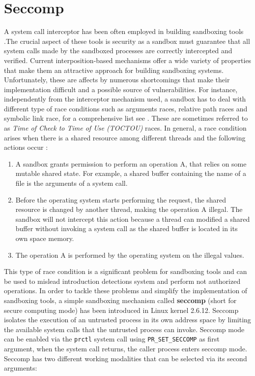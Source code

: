 \section{Seccomp}

A system call interceptor has been often employed in building sandboxing tools \cite{Janus,Garfinkel03ostia:a,MapBox, others}.The crucial aspect of these tools is security as a sandbox must guarantee that all system calls made by the sandboxed processes are correctly intercepted and verified. Current interposition-based mechanisms offer a wide variety of properties that make them an attractive approach for building sandboxing systems. Unfortunately, these are affects by numerous shortcomings that make their implementation difficult and a possible source of vulnerabilities. For instance, independently from the interceptor mechanism used, a sandbox has to deal with different type of race conditions such as arguments races, relative path races and symbolic link race, for a comprehensive list see \cite{garfinkel:traps, Watson_exploitingconcurrency}. These are sometimes referred to as \textit{Time of Check to Time of Use (TOCTOU)} races. In general, a race condition arises when there is a shared resource among different threads and the following actions occur : 
\begin{enumerate}

\item A sandbox grants permission to perform an operation A, that relies on some mutable shared state. For example, a shared buffer containing the name of a file is the arguments of a system call. 

\item Before the operating system starts performing the request, the shared resource is changed by another thread, making the operation A illegal. The sandbox will not intercept this action because a thread can modified a shared buffer without invoking a system call as the shared buffer is located in its own space memory. 

\item The operation A is performed by the operating system on the illegal values. 
\end{enumerate}  

This type of race condition is a significant problem for sandboxing tools and can be used to mislead introduction detections system and perform not authorized operations. In order to tackle these problems and simplify the implementation of sandboxing tools, a simple sandboxing mechanism called \textbf{seccomp} (short for secure computing mode)  has been introduced in Linux kernel 2.6.12. Seccomp isolates the execution of an untrusted process in its own address space by limiting the available system calls that the untrusted process can invoke. Seccomp mode can be enabled via the \lstinline$prctl$ \cite{prctl}  system call using \lstinline$PR_SET_SECCOMP$  as first argument, when the system call returns,  the caller process enters seccomp mode. Seccomp has two different working modalities that can be selected via its second arguments:  

